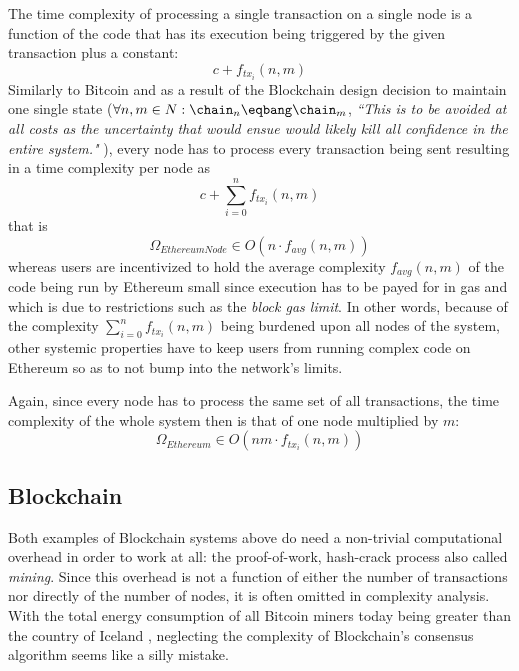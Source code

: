\documentclass[twocolumn,showpacs,
  nofootinbib,aps,superscriptaddress,
  eqsecnum,prd,notitlepage,showkeys,10pt]{revtex4-1}
\begin{document}
The time complexity of processing a single transaction on a single node is a function of the code that has its execution being triggered by the given transaction plus a constant:
\begin{equation}
c+f_{tx_i}(n,m)
\end{equation}
Similarly to Bitcoin and as a result of the Blockchain design decision to maintain one single state ($\forall n,m \in N: \chain_n\eqbang\chain_m$, \textit{``This is to be avoided at all costs as the uncertainty that would ensue would likely kill all confidence in the entire system."} \cite{yellowpaper}), every node has to process every transaction being sent resulting in a time complexity per node as
\begin{equation}
c+\sum_{i=0}^n f_{tx_i}(n,m)
\end{equation}
that is
\begin{equation}
\Omega_{EthereumNode} \in O(n \cdot f_{avg}(n,m))
\end{equation}
whereas users are incentivized to hold the average complexity $f_{avg}(n,m)$
of the code being run by Ethereum small
since execution has to be payed for in gas and which is due to restrictions such as the \textit{block gas limit}.
In other words, because of the complexity $\sum_{i=0}^n f_{tx_i}(n,m)$ being burdened upon all nodes of the system, other systemic properties have to keep users from running complex code on Ethereum so as to not bump into the network's limits.

Again, since every node has to process the same set of all transactions, the time complexity of the whole system then is that of one node multiplied by $m$:
\begin{equation}
\Omega_{Ethereum} \in O(nm\cdot f_{tx_i}(n,m))
\end{equation}

\subsection{Blockchain}
\label{sec:complex:blockchain}
Both examples of Blockchain systems above do need a non-trivial computational overhead in order to work at all: the proof-of-work, hash-crack process also called \textit{mining}. Since this overhead is not a function of either the number of transactions nor directly of the number of nodes, it is often omitted in complexity analysis. With the total energy consumption of all Bitcoin miners today being greater than the country of Iceland \cite{mining-consumption}, neglecting the complexity of Blockchain's consensus algorithm seems like a silly mistake.
\end{document}
